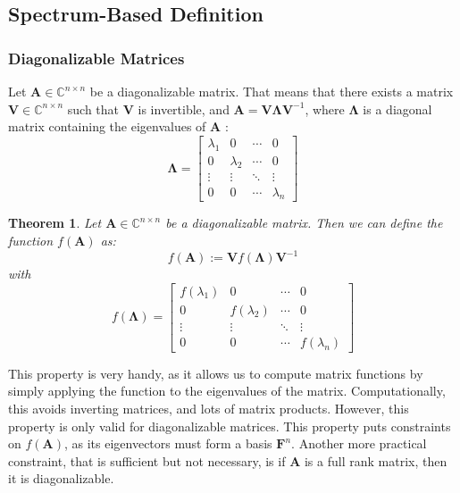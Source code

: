 \documentclass[11pt]{article}
\newtheorem{theorem}{Theorem}
\numberwithin{equation}{section}
\begin{document}
\subsection{Spectrum-Based Definition}
\subsubsection*{Diagonalizable Matrices}
Let $\mathbf{A}\in\mathbb{C}^{n\times n}$ be a diagonalizable matrix. That means that there exists a matrix $\mathbf{V}\in\mathbb{C}^{n\times n}$ such that $\mathbf{V}$ is invertible, and $\mathbf{A} = \mathbf{V}\mathbf{\Lambda}\mathbf{V}^{-1}$, where $\mathbf{\Lambda}$ is a diagonal matrix containing the eigenvalues of $\mathbf{A}$ :
\begin{equation}
    \mathbf{\Lambda} = \begin{bmatrix}
        \lambda_1 & 0 & \cdots & 0 \\
        0 & \lambda_2 & \cdots & 0 \\
        \vdots & \vdots & \ddots & \vdots \\
        0 & 0 & \cdots & \lambda_n
    \end{bmatrix}
\end{equation}
\begin{theorem}
    Let $\mathbf{A}\in\mathbb{C}^{n\times n}$ be a diagonalizable matrix. Then we can define the function $f(\mathbf{A})$ as:
    \begin{equation}
        f(\mathbf{A}) := \mathbf{V}f(\mathbf{\Lambda})\mathbf{V}^{-1}
    \end{equation}
    with 
    \begin{equation}
        f(\mathbf{\Lambda}) = \begin{bmatrix}
            f(\lambda_1) & 0 & \cdots & 0 \\
            0 & f(\lambda_2) & \cdots & 0 \\
            \vdots & \vdots & \ddots & \vdots \\
            0 & 0 & \cdots & f(\lambda_n)
        \end{bmatrix}
    \end{equation}        
\end{theorem}
This property is very handy, as it allows us to compute matrix functions by simply applying the function to the eigenvalues of the matrix. Computationally, this avoids inverting matrices, and lots of matrix products. However, this property is only valid for diagonalizable matrices. This property puts constraints on $f(\mathbf{A})$, as its eigenvectors must form a basis $\mathbf{F}^n$. Another more practical constraint, that is sufficient but not necessary, is if $\mathbf{A}$ is a full rank matrix, then it is diagonalizable.
\end{document}
